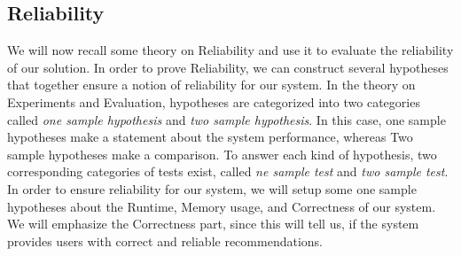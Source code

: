 \subsection{Reliability}
We will now recall some theory on Reliability and use it to evaluate the reliability of our solution. In order to prove Reliability, we can construct several hypotheses that together ensure a notion of reliability for our system. In the theory on
Experiments and Evaluation, hypotheses are categorized into two categories called \textit{one sample hypothesis} and \textit{two sample hypothesis}. In this case, one sample hypotheses make a statement about the system performance, whereas Two sample hypotheses make a comparison. To answer each kind of hypothesis, two corresponding categories of tests exist, called \textit{ne sample test} and \textit{two sample test}.
In order to ensure reliability for our system, we will setup some one sample hypotheses about the Runtime, Memory usage, and Correctness of our system. We will emphasize the Correctness part, since this will tell us, if the system provides users with correct and reliable recommendations.
